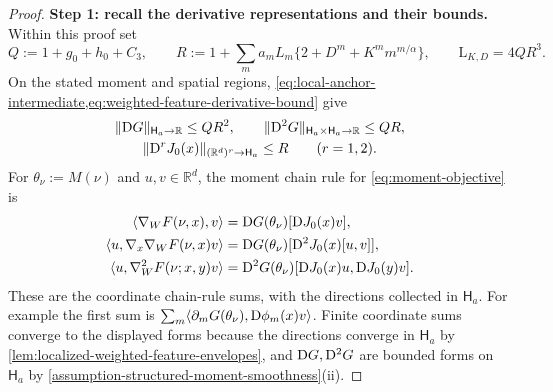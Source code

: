 \begin{proof}
\noindent\textbf{Step 1: recall the derivative representations and their bounds.}
Within this proof set
\[
 Q:=1+g_0+h_0+C_3,\qquad
 R:=1+\sum_m a_mL_m\{2+D^m+K^m m^{m/\alpha}\},
 \qquad \mathrm L_{K,D}=4QR^3.
\]
On the stated moment and spatial regions,
\cref{eq:local-anchor-intermediate,eq:weighted-feature-derivative-bound} give
\begin{equation}
\label{eq:local-proof-bounds}
\begin{gathered}
 \|\mathrm{D} G\|_{\mathsf H_a\to\mathbb R}\le QR^2,\qquad
 \|\mathrm{D}^2G\|_{\mathsf H_a\times\mathsf H_a\to\mathbb R}\le QR,\\
 \|\mathrm{D}^rJ_0(x)\|_{(\mathbb R^d)^r\to\mathsf H_a}\le R
       \qquad(r=1,2).
\end{gathered}
\end{equation}
For $\theta_\nu:=M(\nu)$ and $u,v\in\mathbb R^d$, the moment chain rule for
\cref{eq:moment-objective} is
\begin{align}
 \langle\nabla_WF(\nu,x),v\rangle
 &=\mathrm{D} G(\theta_\nu)[\mathrm{D} J_0(x)v],
 \label{eq:weighted-gradient-representation}\\
 \langle u,\nabla_x\nabla_WF(\nu,x)v\rangle
 &=\mathrm{D} G(\theta_\nu)[\mathrm{D}^2J_0(x)[u,v]],
 \label{eq:weighted-spatial-hessian-representation}\\
 \langle u,\nabla_W^2F(\nu;x,y)v\rangle
 &=\mathrm{D}^2G(\theta_\nu)[\mathrm{D} J_0(x)u,\mathrm{D} J_0(y)v].
 \label{eq:weighted-integral-hessian-representation}
\end{align}
These are the coordinate chain-rule sums, with the directions collected
in $\mathsf H_a$. For example the first sum is
$\sum_m\langle\partial_mG(\theta_\nu),\mathrm{D}\phi_m(x)v\rangle$.
Finite coordinate sums converge to the displayed forms because the
directions converge in $\mathsf H_a$ by
\cref{lem:localized-weighted-feature-envelopes}, and $\mathrm{D} G,\mathrm{D}^2G$ are
bounded forms on $\mathsf H_a$ by
\cref{assumption-structured-moment-smoothness}(ii).


\end{proof}
